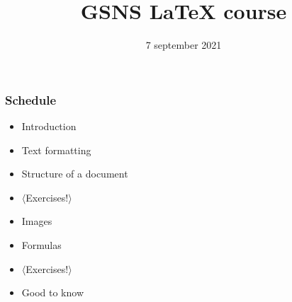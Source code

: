 

\title{GSNS \LaTeX{} course}
\author{\TeXniCie}
\date{7 september 2021}





\begin{frame}
	\titlepage
	\centering
\end{frame}

\begin{frame}
	\frametitle{Schedule}
	
	\begin{itemize}
		\item Introduction
		\item Text formatting
		\item Structure of a document
		\item $ \langle $Exercises!$ \rangle $
		\item Images
		\item Formulas
		\item $ \mathbf\langle $Exercises!$ \rangle $
		\item Good to know
	\end{itemize}
\end{frame}











% 



